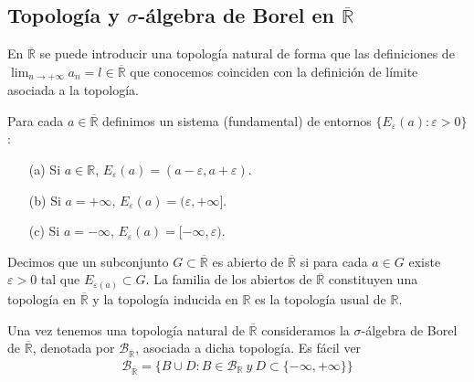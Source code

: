 \subsection{Topología y $\sigma$-álgebra de Borel en $\overline{\mathbb{R}}$}
En $\overline{\mathbb{R}}$ se puede introducir una topología natural de forma que las definiciones de $\lim_{n \to +\infty}{a_n} = l \in \overline{\mathbb{R}}$ que conocemos coinciden con la definición de límite asociada a la topología.
\begin{defi}
Para cada $a \in \overline{\mathbb{R}}$ definimos un sistema (fundamental) de entornos $\{ E_{\varepsilon}(a) : \varepsilon > 0\}$:
\begin{enumerate}
    \item[(a)] Si $a \in \mathbb{R}$, $E_{\varepsilon}(a) = (a-\varepsilon, a+\varepsilon)$.
    \item[(b)] Si $a = +\infty$, $E_{\varepsilon}(a) = (\varepsilon, +\infty]$.
    \item[(c)] Si $a = - \infty$, $E_{\varepsilon}(a) = [-\infty, \varepsilon)$.
\end{enumerate}
Decimos que un subconjunto $G \subset \overline{\mathbb{R}}$ es abierto de $\overline{\mathbb{R}}$ si para cada $a \in G$ existe $\varepsilon > 0$ tal que $E_{\varepsilon(a)} \subset G$. La familia de los abiertos de $\overline{\mathbb{R}}$ constituyen una topología en $\overline{\mathbb{R}}$ y la topología inducida en $\mathbb{R}$ es la topología usual de $\mathbb{R}$.
\end{defi}

Una vez tenemos una topología natural de $\overline{\mathbb{R}}$ consideramos la $\sigma$-álgebra de Borel de $\overline{\mathbb{R}}$, denotada por $\mathcal{B}_{\overline{\mathbb{R}}}$, asociada a dicha topología. Es fácil ver
\begin{align*}
    \mathcal{B}_{\overline{\mathbb{R}}} = \{ B \cup D : B \in \mathcal{B}_{\mathbb{R}} \ y \ D \subset \{ -\infty, +\infty\} \}
\end{align*}

